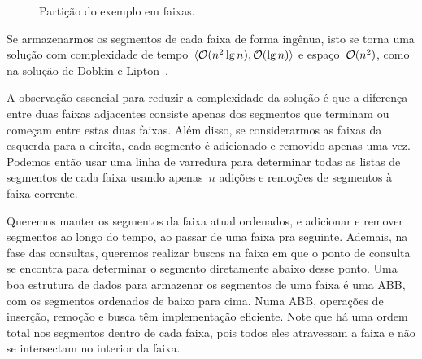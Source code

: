 \documentclass[../../main.tex]{subfiles}
\begin{document}
\begin{figure}[h]
\centering
{}
\caption{Partição do exemplo em faixas.} \label{fig:slabs}
\end{figure}

Se armazenarmos os segmentos de cada faixa de forma ingênua, isto se torna uma solução com complexidade de tempo~$\langle\mathcal{O}(n^2 \lg n), \mathcal{O}(\lg n)\rangle$ e espaço~$\mathcal{O}(n^2)$, como na solução de Dobkin e Lipton~\cite{DobkinL76}.

A observação essencial para reduzir a complexidade da solução é que a diferença entre duas faixas adjacentes consiste apenas dos segmentos que terminam ou começam entre estas duas faixas. Além disso, se considerarmos as faixas da esquerda para a direita, cada segmento é adicionado e removido apenas uma vez. Podemos então usar uma linha de varredura para determinar todas as listas de segmentos de cada faixa usando apenas~$n$ adições e remoções de segmentos à faixa corrente.

Queremos manter os segmentos da faixa atual ordenados, e adicionar e remover segmentos ao longo do tempo, ao passar de uma faixa pra seguinte. Ademais, na fase das consultas, queremos realizar buscas na faixa em que o ponto de consulta se encontra para determinar o segmento diretamente abaixo desse ponto.
Uma boa estrutura de dados para armazenar os segmentos de uma faixa é uma ABB, com os segmentos ordenados de baixo para cima. Numa ABB, operações de inserção, remoção e busca têm implementação eficiente.
Note que há uma ordem total nos segmentos dentro de cada faixa, pois todos eles atravessam a faixa e não se intersectam no interior da faixa.
\end{document}
